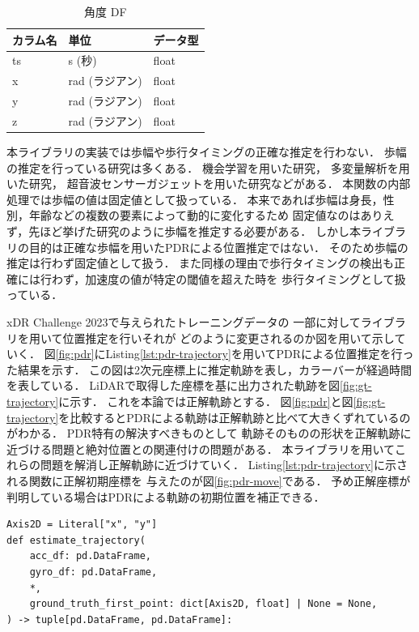 \begin{table}[ht]
  \caption{角度 DF}
	\centering
	\begin{tabular}{lll}
		\toprule
		カラム名 & 単位         & データ型  \\
		\midrule
		ts   & s (秒)      & float \\
		x    & rad (ラジアン) & float \\
		y    & rad (ラジアン) & float \\
		z    & rad (ラジアン) & float \\
		\bottomrule
	\end{tabular}
\end{table}


本ライブラリの実装では歩幅や歩行タイミングの正確な推定を行わない．
歩幅の推定を行っている研究は多くある．
機会学習を用いた研究\cite{stride-length-auto-learning}，
多変量解析を用いた研究\cite{stride-length-multi}，
超音波センサーガジェットを用いた研究\cite{stride-length-ultrasonic}などがある．
本関数の内部処理では歩幅の値は固定値として扱っている．
本来であれば歩幅は身長，性別，年齢などの複数の要素によって動的に変化するため
固定値なのはありえず，先ほど挙げた研究のように歩幅を推定する必要がある．
しかし本ライブラリの目的は正確な歩幅を用いたPDRによる位置推定ではない．
そのため歩幅の推定は行わず固定値として扱う．
また同様の理由で歩行タイミングの検出も正確には行わず，加速度の値が特定の閾値を超えた時を
歩行タイミングとして扱っている．

xDR Challenge 2023で与えられたトレーニングデータの
一部に対してライブラリを用いて位置推定を行いそれが
どのように変更されるのか図を用いて示していく．
図\ref{fig:pdr}にListing\ref{lst:pdr-trajectory}を用いてPDRによる位置推定を行った結果を示す．
この図は2次元座標上に推定軌跡を表し，カラーバーが経過時間を表している．
LiDARで取得した座標を基に出力された軌跡を図\ref{fig:gt-trajectory}に示す．
これを本論では正解軌跡とする．
図\ref{fig:pdr}と図\ref*{fig:gt-trajectory}を比較するとPDRによる軌跡は正解軌跡と比べて大きくずれているのがわかる．
PDR特有の解決すべきものとして
軌跡そのものの形状を正解軌跡に近づける問題と絶対位置との関連付けの問題がある．
本ライブラリを用いてこれらの問題を解消し正解軌跡に近づけていく．
Listing\ref{lst:pdr-trajectory}に示される関数に正解初期座標を
与えたのが図\ref{fig:pdr-move}である．
予め正解座標が判明している場合はPDRによる軌跡の初期位置を補正できる．



\begin{lstlisting}[caption={基本PDR}, label=lst:pdr-trajectory,float =h]
Axis2D = Literal["x", "y"]
def estimate_trajectory(
    acc_df: pd.DataFrame,
    gyro_df: pd.DataFrame,
    *,
    ground_truth_first_point: dict[Axis2D, float] | None = None,
) -> tuple[pd.DataFrame, pd.DataFrame]:
\end{lstlisting}

